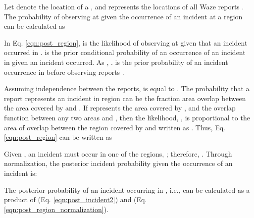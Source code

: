 \documentclass[conference]{IEEEtran}
\begin{document}
Let  denote the location of a , and  represents the locations of all Waze reports . The probability of observing  at  given the occurrence of an incident at a region  can be calculated as 

\vspace{-0.18in}


In Eq. \ref{eqn:post_region},  is the likelihood of observing  at  given that an incident occurred in .  is the prior conditional probability of an occurrence of an incident in  given an incident occurred. As , .  is the prior probability of an incident occurrence in  before observing reports . 

Assuming independence between the reports,  is equal to . The probability that a report  represents an incident in region  can be the fraction area overlap between the area covered by  and . If  represents the area covered by , and  the overlap function between any two areas  and , then the likelihood, , is proportional to the area of overlap between the region covered by  and  written as . Thus, Eq. \ref{eqn:post_region} can be written as

\vspace{-0.18in}


Given , an incident must occur in one of the  regions, ; therefore, . Through normalization, the posterior incident probability given the occurrence of an incident is: 

\vspace{-0.18in}


The posterior probability of an incident occurring in , i.e.,  can be calculated as a product of  (Eq. \ref{eqn:post_incident2})  and  (Eq. \ref{eqn:post_region_normalization}).  
\end{document}
